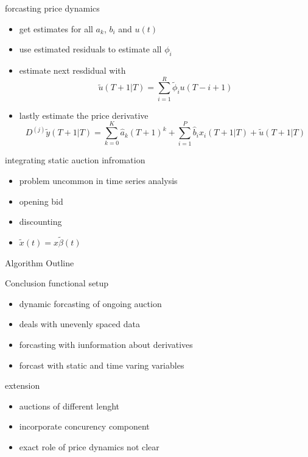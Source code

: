 \documentclass[hyperref={pdfpagelabels=false}]{beamer}
\begin{document}
\begin{frame}{forcasting price dynamics}
\begin{itemize}
	\item get estimates for all $a_k$, $b_i$ and $u(t)$
	\item use estimated residuals to estimate all $\phi_i$
	\item estimate next resdidual with \begin{equation}  \tilde{u}(T+1|T)=\sum_{i=1}^R\tilde{\phi}_iu(T-i+1) \nonumber \end{equation}
	\item lastly estimate the price derivative \begin{equation} D^{(j)}\tilde{y}(T+1|T) =\sum_{k=0}^K\hat{a}_k(T+1)^k+\sum_{i=1}^P\hat{b}_ix_i(T+1|T)+\tilde{u}(T+1|T) \nonumber \end{equation}
\end{itemize}	
\end{frame}

\begin{frame}{integrating static auction infromation}%
\begin{itemize}
	\item problem uncommon in time series analysis
	\item opening bid
	\item discounting
	\item $\tilde{x}(t)=x\tilde{\beta}(t)$
\end{itemize}
\end{frame}

\begin{frame}{Algorithm Outline}

\end{frame}

\begin{frame}{Conclusion}
functional setup
\begin{itemize}
\item dynamic forcasting of ongoing auction
\item deals with unevenly spaced data
\item forcasting with iunformation about derivatives
\item forcast with static and time varing variables
\end{itemize}

extension
\begin{itemize}
\item auctions of different lenght
\item incorporate concurency component
\item exact role of price dynamics not clear
\end{itemize}
\end{frame}
\end{document}
